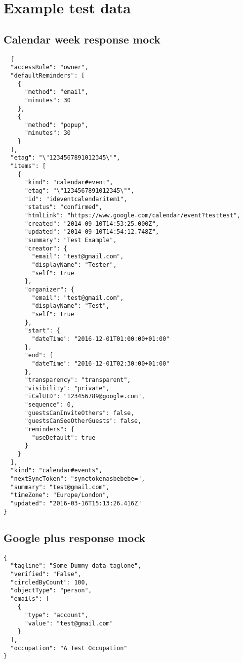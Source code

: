\chapter{Example test data}
\label{appendix:test_data}

\section{Calendar week response mock}
\begin{lstlisting}
  {
  "accessRole": "owner",
  "defaultReminders": [
    {
      "method": "email",
      "minutes": 30
    },
    {
      "method": "popup",
      "minutes": 30
    }
  ],
  "etag": "\"1234567891012345\"",
  "items": [
    {
      "kind": "calendar#event",
      "etag": "\"1234567891012345\"",
      "id": "ideventcalendaritem1",
      "status": "confirmed",
      "htmlLink": "https://www.google.com/calendar/event?testtest",
      "created": "2014-09-10T14:53:25.000Z",
      "updated": "2014-09-10T14:54:12.748Z",
      "summary": "Test Example",
      "creator": {
        "email": "test@gmail.com",
        "displayName": "Tester",
        "self": true
      },
      "organizer": {
        "email": "test@gmail.com",
        "displayName": "Test",
        "self": true
      },
      "start": {
        "dateTime": "2016-12-01T01:00:00+01:00"
      },
      "end": {
        "dateTime": "2016-12-01T02:30:00+01:00"
      },
      "transparency": "transparent",
      "visibility": "private",
      "iCalUID": "123456789@google.com",
      "sequence": 0,
      "guestsCanInviteOthers": false,
      "guestsCanSeeOtherGuests": false,
      "reminders": {
        "useDefault": true
      }
    }
  ],
  "kind": "calendar#events",
  "nextSyncToken": "synctokenasbebebe=",
  "summary": "test@gmail.com",
  "timeZone": "Europe/London",
  "updated": "2016-03-16T15:13:26.416Z"
}

\end{lstlisting}

\section{Google plus response mock}
\begin{lstlisting}
{
  "tagline": "Some Dummy data taglone",
  "verified": "False",
  "circledByCount": 100,
  "objectType": "person",
  "emails": [
    {
      "type": "account",
      "value": "test@gmail.com"
    }
  ],
  "occupation": "A Test Occupation"
}
\end{lstlisting}
